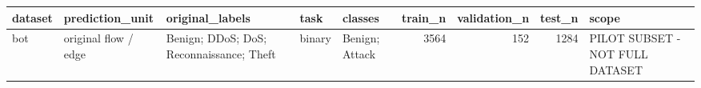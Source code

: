 \begin{tabular}{lllllrrrl}
\toprule
dataset & prediction\_unit & original\_labels & task & classes & train\_n & validation\_n & test\_n & scope \\
\midrule
bot & original flow / edge & Benign; DDoS; DoS; Reconnaissance; Theft & binary & Benign; Attack & 3564 & 152 & 1284 & PILOT SUBSET - NOT FULL DATASET \\
\bottomrule
\end{tabular}
